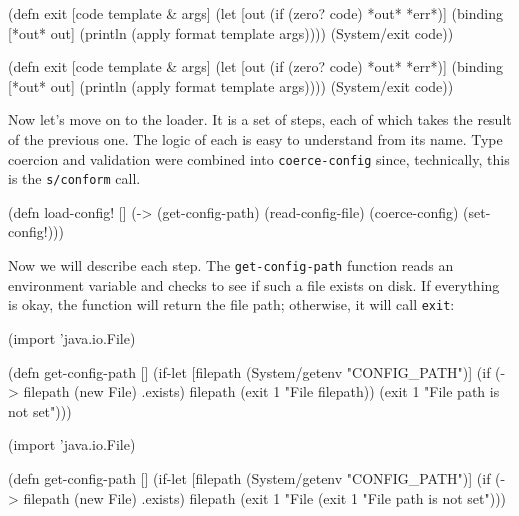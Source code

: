 
\ifx\DEVICETYPE\MOBILE

\begin{clojure}
(defn exit
  [code template & args]
  (let [out (if (zero? code)
              *out*
              *err*)]
    (binding [*out* out]
      (println (apply format
        template args))))
  (System/exit code))
\end{clojure}

\else

\begin{clojure}
(defn exit
  [code template & args]
  (let [out (if (zero? code) *out* *err*)]
    (binding [*out* out]
      (println (apply format template args))))
  (System/exit code))
\end{clojure}

\fi

Now let's move on to the loader. It is a set of steps, each of which takes the result of the previous one. The logic of each is easy to understand from its name. Type coercion and validation were combined into \verb|coerce-config| since, technically, this is the \verb|s/conform| call.


\begin{clojure}
(defn load-config! []
  (-> (get-config-path)
      (read-config-file)
      (coerce-config)
      (set-config!)))
\end{clojure}

Now we will describe each step. The \verb|get-config-path| function reads an environment variable and checks to see if such a file exists on disk. If everything is okay, the function will return the file path; otherwise, it will call \verb|exit|:


\ifx\DEVICETYPE\MOBILE

\begin{clojure}
(import 'java.io.File)

(defn get-config-path []
  (if-let [filepath (System/getenv
                      "CONFIG_PATH")]
    (if (-> filepath (new File) .exists)
      filepath
      (exit 1 "File %
        filepath))
    (exit 1 "File path is not set")))
\end{clojure}

\else

\begin{clojure}
(import 'java.io.File)

(defn get-config-path []
  (if-let [filepath (System/getenv "CONFIG_PATH")]
    (if (-> filepath (new File) .exists)
      filepath
      (exit 1 "File %
    (exit 1 "File path is not set")))
\end{clojure}

